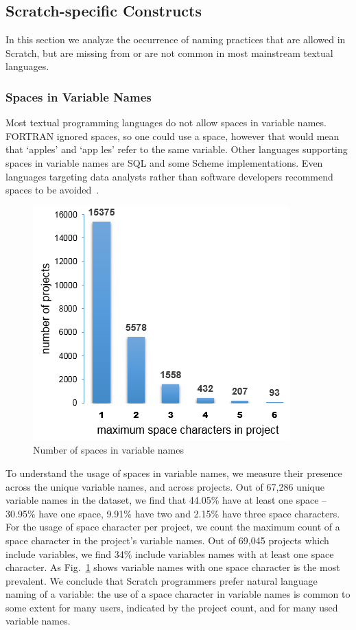 \documentclass[conference]{IEEEtran}
\begin{document}
\subsection{Scratch-specific Constructs}
\label{res:Scratch:specific}
In this section we analyze the occurrence of naming practices that are allowed in Scratch, but are missing from or are not common in most mainstream textual languages.
\subsubsection{Spaces in Variable Names}
Most textual programming languages do not allow spaces in variable names. 
FORTRAN ignored spaces, so one could use a space, however that would mean that `apples' and `app les' refer to the same variable. Other languages supporting spaces in variable names are SQL and some Scheme implementations. 
Even languages targeting data analysts rather than software developers recommend spaces to be avoided~\cite{Bochud}.
\begin{figure}
	\begin{center}
		\includegraphics[scale=0.48]{fig/project/space}
		\caption{Number of spaces in variable names}
		\label{fig:number_of_spaces}
	\end{center}
\end{figure} 
To understand the usage of spaces in variable names, we measure their presence across the unique variable names, and across projects. Out of 67,286 unique variable names in the dataset, we find that 44.05\% have at least one space --30.95\% have one space, 9.91\% have two and 2.15\% have three space characters. For the usage of space character per project, we count the maximum count of a space character in the project's variable names. Out of 69,045 projects which include variables, we find 34\% include variables names with at least one space character. As Fig.~\ref{fig:number_of_spaces} shows variable names with one space character is the most prevalent. 
We conclude that Scratch programmers prefer natural language naming of a variable: the use of a space character in variable names is common to some extent for many users, indicated by the project count, and for many used variable names. 
\end{document}
